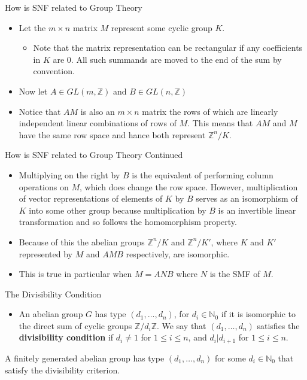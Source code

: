 \documentclass{beamer}
\begin{document}
\begin{frame}{How is SNF related to Group Theory}
    \begin{itemize}
        \item Let the $m \times n$ matrix $M$ represent some cyclic group $K$.
        \begin{itemize}
            \item Note that the matrix representation can be rectangular if any coefficients in $K$ are 0. All such summands are moved to the end of the sum by convention.
        \end{itemize}
        \item Now let $A \in GL(m, \mathbb{Z})$ and $B \in GL(n, \mathbb{Z})$
        \item Notice that $AM$ is also an $m \times n$ matrix the rows of which are linearly independent linear combinations of rows of $M$. This means that $AM$ and $M$ have the same row space and hance both represent $\mathbb{Z}^n/K$.
    \end{itemize}
\end{frame}
\begin{frame}{How is SNF related to Group Theory Continued}
    \begin{itemize}
        \item Multiplying on the right by $B$ is the equivalent of performing column operations on $M$, which does change the row space. However, multiplication of vector representations of elements of $K$ by $B$ serves as an isomorphism of $K$ into some other group because multiplication by $B$ is an invertible linear transformation and so follows the homomorphism property.
        \item Because of this the abelian groups $\mathbb{Z}^n/K$ and $\mathbb{Z}^n/K'$, where $K$ and $K'$ represented by $M$ and $AMB$ respectively, are isomorphic.
        \item This is true in particular when $M = ANB$ where $N$ is the SMF of $M$.
    \end{itemize}
\end{frame}
\begin{frame}{The Divisibility Condition}
    \begin{itemize}
        \item An abelian group $G$ has type $(d_1,\ldots, d_n)$, for $d_i \in \mathbb{N}_0$ if it is isomorphic to the direct sum of cyclic groups $\mathbb{Z}/d_i\mathbb{Z}$. We say that $(d_1,\ldots, d_n)$ satisfies the \textbf{divisibility condition} if $d_i \neq 1$ for $1 \leq i \leq n$, and $d_i|d_{i+1}$ for $1 \leq i \leq n$.
    \end{itemize}
    \begin{Theorem}
        A finitely generated abelian group has type $(d_1,\ldots, d_n)$ for some $d_i \in \mathbb{N}_0$ that satisfy the divisibility criterion.
    \end{Theorem}
\end{frame}
\end{document}
